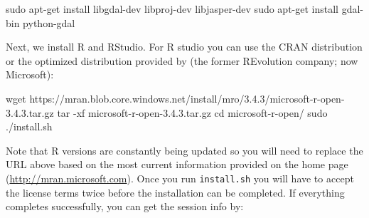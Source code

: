 \documentclass[graybox,natbib,nospthms,UStrade]{svmono}
\newenvironment{Shaded}{\begin{snugshade}}{\end{snugshade}}
\newcommand{\BuiltInTok}[1]{#1}
\newcommand{\FunctionTok}[1]{\textcolor[rgb]{0,0,0}{#1}}
\newcommand{\NormalTok}[1]{#1}
\begin{document}
\begin{Shaded}
\begin{Highlighting}[]
\FunctionTok{sudo}\NormalTok{ apt-get install libgdal-dev libproj-dev libjasper-dev}
\FunctionTok{sudo}\NormalTok{ apt-get install gdal-bin python-gdal}
\end{Highlighting}
\end{Shaded}

Next, we install R and RStudio. For R studio you can use the CRAN distribution or the optimized distribution provided by (the former REvolution company; now Microsoft):

\begin{Shaded}
\begin{Highlighting}[]
\FunctionTok{wget}\NormalTok{ https://mran.blob.core.windows.net/install/mro/3.4.3/microsoft-r-open-3.4.3.tar.gz}
\FunctionTok{tar}\NormalTok{ -xf microsoft-r-open-3.4.3.tar.gz}
\BuiltInTok{cd}\NormalTok{ microsoft-r-open/}
\FunctionTok{sudo}\NormalTok{ ./install.sh}
\end{Highlighting}
\end{Shaded}

Note that R versions are constantly being updated so you will need to replace the URL above based on the most current information provided on the home page (\url{http://mran.microsoft.com}). Once you run \texttt{install.sh} you will have to accept the license terms twice before the installation can be completed. If everything completes successfully, you can get the session info by:
\end{document}
